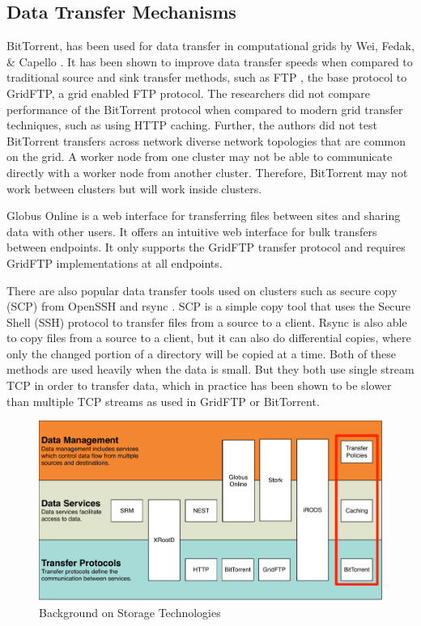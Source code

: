\subsection{Data Transfer Mechanisms}

BitTorrent, has been used for data transfer in computational grids by Wei, Fedak, \& Capello \cite{wei2005collaborative, wei2005scheduling, wei2007towards}.  It has been shown to improve data transfer speeds when compared to traditional source and sink transfer methods, such as FTP \cite{postel1985file}, the base protocol to GridFTP, a grid enabled FTP protocol.  The researchers did not compare performance of the BitTorrent protocol when compared to modern grid transfer techniques, such as using HTTP caching.  Further, the authors did not test BitTorrent transfers across network diverse network topologies that are common on the grid.  A worker node from one cluster may not be able to communicate directly with a worker node from another cluster.  Therefore, BitTorrent may not work between clusters but will work inside clusters.

Globus Online \cite{foster2011globus} is a web interface for transferring files between sites and sharing data with other users.  It offers an intuitive web interface for bulk transfers between endpoints.  It only supports the GridFTP \cite{allcock2005globus} transfer protocol and requires GridFTP implementations at all endpoints.

There are also popular data transfer tools used on clusters such as secure copy (SCP) from OpenSSH \cite{openssh} and rsync \cite{rsynce}.  SCP is a simple copy tool that uses the Secure Shell (SSH) protocol to transfer files from a source to a client.  Rsync is also able to copy files from a source to a client, but it can also do differential copies, where only the changed portion of a directory will be copied at a time.  Both of these methods are used heavily when the data is small.  But they both use single stream TCP in order to transfer data, which in practice has been shown to be slower than multiple TCP streams as used in GridFTP \cite{allcock2005globus} or BitTorrent.



\begin{figure}[ht!]
	\centering
	\includegraphics[width=\textwidth]{images/BackgroundStorageDiagram2.pdf}
	\caption{Background on Storage Technologies}
	\label{fig:backgroundstorage}
\end{figure}


